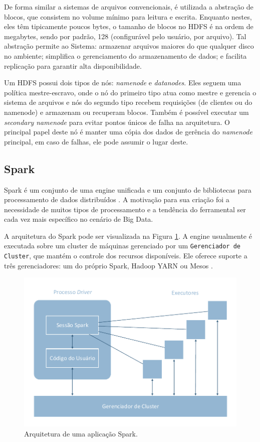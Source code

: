 De forma similar a sistemas de arquivos convencionais, é utilizada a abstração 
de blocos, que consistem no volume mínimo para leitura e escrita. Enquanto 
nestes, eles têm tipicamente poucos bytes, o tamanho de blocos no HDFS 
é na ordem de megabytes, sendo por padrão, 128 (configurável pelo usuário, por 
arquivo). Tal abstração permite ao Sistema: armazenar arquivos maiores do que 
qualquer disco no ambiente; simplifica o gerenciamento do armazenamento de 
dados; e facilita replicação para garantir alta disponibilidade.

Um HDFS possui dois tipos de nós: \emph{namenode} e \emph{datanodes}. Eles 
seguem uma política mestre-escravo, onde o nó do primeiro tipo atua como mestre 
e gerencia o sistema de arquivos e nós do segundo tipo recebem requisições (de 
clientes ou do namenode) e armazenam ou recuperam blocos. Também é possível 
executar um \textit{secondary namenode} para evitar pontos únicos de falha na 
arquitetura. O principal papel deste nó é manter uma cópia dos dados de gerência 
do \textit{namenode} principal, em caso de falhas, ele pode assumir o lugar 
deste.

\subsection{Spark} \label{ref:spark}

Spark é um conjunto de uma engine unificada e um conjunto de bibliotecas para 
processamento de dados distribuídos \cite{ref:sparkbook}. A motivação para sua 
criação foi a necessidade de muitos tipos de processamento e a tendência do 
ferramental ser cada vez mais específico no cenário de Big Data.

A arquitetura do Spark pode ser visualizada na Figura \ref{fig:spark-arch}. A 
engine usualmente é executada sobre um cluster de máquinas gerenciado por um 
\texttt{Gerenciador de Cluster}, que mantém o controle dos recursos 
disponíveis. Ele oferece suporte a três gerenciadores: um do próprio Spark, 
Hadoop YARN ou Mesos \cite{ref:mesos}.

\begin{figure}[ht]
 \centerline{\includegraphics[width=1\textwidth]{./img/spark-arch.pdf}}
 \caption{Arquitetura de uma aplicação Spark.}
 \label{fig:spark-arch}
\end{figure}

